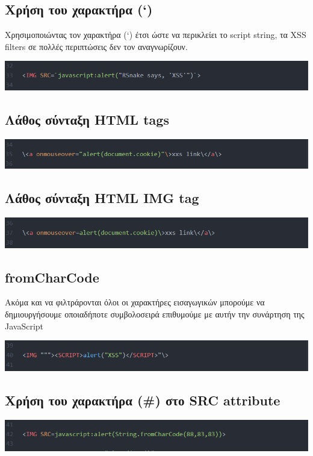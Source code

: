 \subsection{Χρήση του χαρακτήρα (`)}
\noindent
Χρησιμοποιώντας τον χαρακτήρα (`) έτσι ώστε να περικλείει το script string, τα XSS filters  σε πολλές περιπτώσεις δεν τον αναγνωρίζουν.
\begin{center}
			\includegraphics[width=1\textwidth]{image/11.PNG}		
\end{center}

\subsection{Λάθος σύνταξη HTML tags}
\begin{center}
			\includegraphics[width=1\textwidth]{image/12.PNG}		
\end{center}
\subsection{Λάθος σύνταξη HTML IMG tag}
\begin{center}
			\includegraphics[width=1\textwidth]{image/13.PNG}		
\end{center}
\subsection{fromCharCode}
\noindent
Ακόμα και να φιλτράρονται όλοι οι χαρακτήρες εισαγωγικών μπορούμε να δημιουργήσουμε οποιαδήποτε συμβολοσειρά επιθυμούμε με αυτήν την συνάρτηση της JavaScript
\begin{center}
			\includegraphics[width=1\textwidth]{image/14.PNG}		
\end{center}
\subsection{Χρήση του χαρακτήρα (\#) στο SRC attribute }
\begin{center}
			\includegraphics[width=1\textwidth]{image/15.PNG}		
\end{center}
